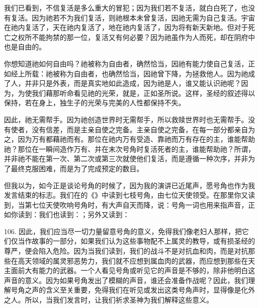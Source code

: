 我们已看到，不信复活是多么重大的冒犯；因为我们若不复活，就白白死了，也没有复活。因为祂若不为我们复活，则祂根本未曾复活，因祂无需为自己复活。宇宙在祂内复活了，天在祂内复活了，地在祂内复活了，因为将有新天新地。但对于死亡之权所不能拘禁的那一位，复活又有何必要？因为祂虽作为人而死，却在阴府中也是自由的。\par

你想知道祂如何自由吗？祂被称为自由者，确然恰当，因祂有能力使自己复活，正如经上所载：祂被称为自由者，也确然恰当，因祂曾下降，为拯救他人。因为祂成了人，并非只是外表，而是真实地如此造成，因为祂是人，谁又能认识祂呢？因为，为使我们藉那听命看见祂的光荣，就是，正如圣所说。这样，圣经的叙述得以保持，若在身上，独生子的光荣与完美的人性都保持不失。\par

因此，祂无需帮手。因为祂创造世界时无需帮手，所以救赎世界时也无需帮手。没有使者，没有信差，而是主亲自使之完备。主亲自使之完备，在每一部分都亲自为之，因为万有都藉祂而有。那位在祂内万有受造、靠祂而万有存在的主，谁能帮助祂？那位在一瞬间造作万有、并在末次号角时复活死者的主，谁能帮助祂？所谓，并非祂不能在第一次、第二次或第三次就使他们复活，而是遵循一种次序，并非为了最终克服困难，而是为了完成预定的数目。\par

但我以为，如今正是谈论号角的时候了，因为我的演讲已近尾声，愿号角也作为我发言结束的标志。我们在的《》中读到七枝号角，由七位天使领受。在那里你又读到，当第七位天使吹响号角时，有大声自天而降，说：号角一词也用来指声音，正如你读到：我们也读到：；另外又读到：\par

106. 因此，我们应当尽一切力量留意号角的意义，免得我们像老妇人那样，把它们仅当作故事的一部分，如果我们认为这些事物配不上属灵的教导，或有损圣经的尊严，便会陷入危险。因为当我们读到，我们的战斗不是对抗血和肉，而是对抗那些在高天领域的属灵邪恶势力，我们就不应想到属血肉的武器，而应想到那些在天主面前大有能力的武器。一个人看见号角或听见它的声音是不够的，除非他明白这声音的意义。因为如果号角发出了模糊的声音，谁还会准备作战呢？因此，我们理解号角之声的含义至关重要，免得我们在听见或发出这类号角声时，显得像是化外之人。所以，当我们发言时，让我们祈求圣神为我们解释这些意义。\par

